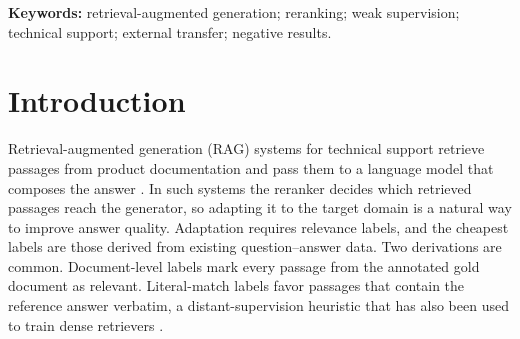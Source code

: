 \begin{abstract}
Rerankers in retrieval-augmented generation (RAG) systems for technical support are often adapted with weak labels derived from question--answer data. We evaluate whether one answer-aware labeling rule---ranking passages that literally contain the reference answer above other passages from the gold document---improves the answers produced by a fixed generator. We adapt Qwen3-Reranker-0.6B with LoRA on TechQA and evaluate the complete pipeline end to end with a fixed Qwen3.5-9B generator over four chunking strategies, under protocols frozen before comparative outcomes existed. On a 208-question TechQA reserve set held out from model selection (Study~1), the literal-match reranker did not significantly outperform hybrid retrieval ($\SoneDelta$ token-F1 points; 95\% CI $\SoneLow$ to $\SoneHigh$; $p=\SoneP$). In a prespecified transfer study on 273 Doc2Dial dialogue turns with three training seeds (Study~2), it was slightly worse than a reranker adapted with standard document-level labels under the same update budget ($\StwoDelta$ points; 95\% CI $\StwoLow$ to $\StwoHigh$; $p=\StwoP$) and had lower evidence NDCG@4 (\LNDCG\ vs \BNDCG). Neither study met its prespecified success criterion, and for these training runs the transfer interval excludes the targeted $+1$-point gain. Large differences in retrieval metrics translated into small differences in answer F1. The results provide no evidence that this answer-containment recipe improves generated answers in the studied setting, and they indicate that evaluations of reranker supervision should measure the final answer directly. Code and aggregate results are publicly available.
\end{abstract}
\noindent\textbf{Keywords:} retrieval-augmented generation; reranking; weak supervision; technical support; external transfer; negative results.

\section{Introduction}
Retrieval-augmented generation (RAG) systems for technical support retrieve passages from product documentation and pass them to a language model that composes the answer \citep{lewis2020}. In such systems the reranker decides which retrieved passages reach the generator, so adapting it to the target domain is a natural way to improve answer quality. Adaptation requires relevance labels, and the cheapest labels are those derived from existing question--answer data. Two derivations are common. Document-level labels mark every passage from the annotated gold document as relevant. Literal-match labels favor passages that contain the reference answer verbatim, a distant-supervision heuristic that has also been used to train dense retrievers \citep{karpukhin2020}.

